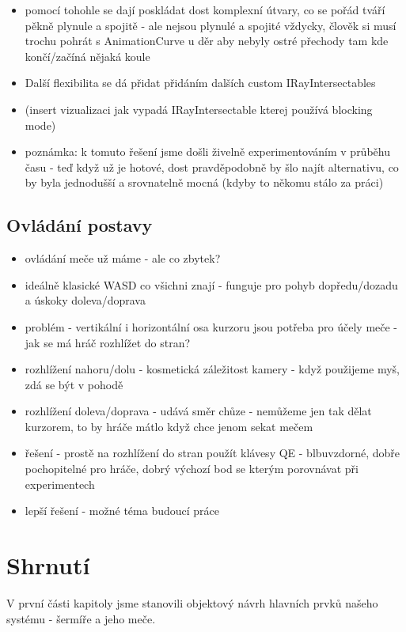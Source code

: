 \begin{itemize}
\begin{itemize}
            \item pomocí tohohle se dají poskládat dost komplexní útvary, co se pořád tváří pěkně plynule a spojitě - ale nejsou plynulé a spojité vždycky, člověk si musí trochu pohrát s AnimationCurve u děr aby nebyly ostré přechody tam kde končí/začíná nějaká koule
            \item Další flexibilita se dá přidat přidáním dalších custom IRayIntersectables
            \item (insert vizualizaci jak vypadá IRayIntersectable kterej používá blocking mode)
            \item poznámka: k tomuto řešení jsme došli živelně experimentováním v průběhu času - teď když už je hotové, dost pravděpodobně by šlo najít alternativu, co by byla jednodušší a srovnatelně mocná (kdyby to někomu stálo za práci)
        \end{itemize}
\end{itemize}

\subsection{Ovládání postavy}
\begin{itemize}
    \item ovládání meče už máme - ale co zbytek?
    \item ideálně klasické WASD co všichni znají - funguje pro pohyb dopředu/dozadu a úskoky doleva/doprava
    \item problém - vertikální i horizontální osa kurzoru jsou potřeba pro účely meče - jak se má hráč rozhlížet do stran?
    \item rozhlížení nahoru/dolu - kosmetická záležitost kamery - když použijeme myš, zdá se být v pohodě
    \item rozhlížení doleva/doprava - udává směr chůze - nemůžeme jen tak dělat kurzorem, to by hráče mátlo když chce jenom sekat mečem 
    \item řešení - prostě na rozhlížení do stran použít klávesy QE - blbuvzdorné, dobře pochopitelné pro hráče, dobrý výchozí bod se kterým porovnávat při experimentech
    \item lepší řešení - možné téma budoucí práce
\end{itemize}


\section{Shrnutí}

V první části kapitoly jsme stanovili objektový návrh hlavních prvků našeho systému - šermíře a jeho meče. 

